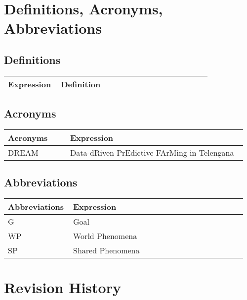 \section{Definitions, Acronyms, Abbreviations}

\subsection{Definitions}

\begin{center}
	\begin{tabular}{@{}p{0.25\linewidth} p{0.71\linewidth}@{}}
		\toprule
		\textbf{Expression} & \textbf{Definition}\\
		\midrule
	\end{tabular}
\end{center}

\subsection{Acronyms}

\begin{center}
	\begin{tabular}{@{}p{0.25\linewidth} p{0.71\linewidth}@{}}
		\toprule
		\textbf{Acronyms} & \textbf{Expression}\\
		\midrule
		DREAM & Data-dRiven PrEdictive FArMing in Telengana\\
		\bottomrule
	\end{tabular}
\end{center}

\subsection{Abbreviations}
\begin{center}
	\begin{tabular}{@{}p{0.25\linewidth} p{0.71\linewidth}@{}}
		\toprule
		\textbf{Abbreviations} & \textbf{Expression}\\
		\midrule
		G & Goal\\
		WP & World Phenomena\\
		SP & Shared Phenomena\\
		\bottomrule
	\end{tabular}
\end{center}

\section{Revision History}

